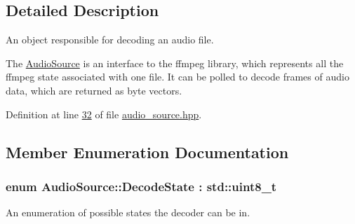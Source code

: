 \subsection{Detailed Description}
An object responsible for decoding an audio file. 

The \hyperlink{classAudioSource}{Audio\+Source} is an interface to the ffmpeg library, which represents all the ffmpeg state associated with one file. It can be polled to decode frames of audio data, which are returned as byte vectors. 

Definition at line \hyperlink{audio__source_8hpp_source_l00032}{32} of file \hyperlink{audio__source_8hpp_source}{audio\+\_\+source.\+hpp}.



\subsection{Member Enumeration Documentation}
\hypertarget{classAudioSource_a9a2f5de44325c84e69a7af1331aa159d}{
\subsubsection[{Decode\+State}]{\setlength{\rightskip}{0pt plus 5cm}enum {\bf Audio\+Source\+::\+Decode\+State} \+: std\+::uint8\+\_\+t\hspace{0.3cm}{\ttfamily [strong]}}}\label{classAudioSource_a9a2f5de44325c84e69a7af1331aa159d}


An enumeration of possible states the decoder can be in. 

